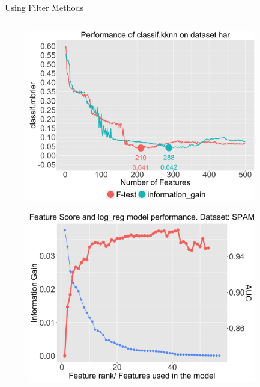 \documentclass[11pt,compress,t,notes=noshow, xcolor=table]{beamer}
\begin{document}
\begin{vbframe}{Using Filter Methods}
\begin{columns}
\begin{column}{0.46\textwidth}
    \begin{figure}
    \centering
    \includegraphics[width=0.89\textwidth]{sl/feature-selection/figure/filter_comparison_har_classif.kknn.png}
    \end{figure}
    \vspace{-0.4cm}
    \begin{figure}
    \includegraphics[width=0.89\textwidth]{sl/feature-selection/figure/fs-filters-scree-plot.png}
    \end{figure}
\end{column}

\end{columns}
\end{vbframe}
\end{document}
